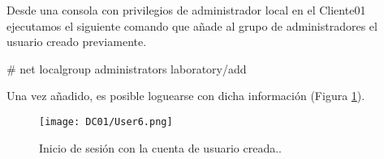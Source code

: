 \begin{itemize}
Desde una consola con privilegios de administrador local en el Cliente01 ejecutamos el siguiente comando que añade al grupo de administradores el usuario creado previamente. 

\begin{listing}[style=consola, numbers=none]
# net localgroup administrators laboratory\mariarperez /add
\end{listing}

Una vez añadido, es posible loguearse con dicha información (Figura \ref{DC01-User6}).

\begin{figure}[H] %
\begin{center}
\texttt{[image: DC01/User6.png]}
\end{center}
\caption{Inicio de sesión con la cuenta de usuario creada..}
\label{DC01-User6}
\end{figure}


\end{itemize}


